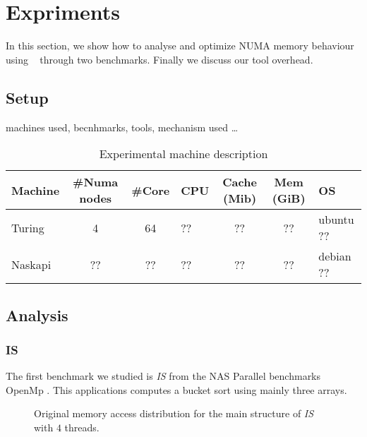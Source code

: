 
\section{Expriments}
\label{sec:expe}
In this section, we show how to analyse and optimize NUMA memory behaviour using
\TABARNAC~ through two benchmarks. Finally we discuss our tool overhead.
\subsection{Setup}
\label{sec:expe-setup}
machines used, becnhmarks, tools, mechanism used \ldots

\begin{table}
    \centering
    \resizebox{\linewidth}{!}
    {
        \begin{tabular}{l|c|c|l|c|c|l}
            Machine & \#Numa nodes & \#Core & CPU & Cache (Mib) & Mem (GiB) & OS\\
            \hline
            Turing & 4 & 64 & ?? & ?? & ?? &  ubuntu ??\\
            \hline
            Naskapi & ?? &?? &?? &?? & ?? &debian ??\\
        \end{tabular}
    }
    \caption{Experimental machine description}
    \label{tab:machines}
\end{table}

\subsection{Analysis}
\label{sec:expe-analysis}

\subsubsection{IS}
The first benchmark we studied is \emph{IS} from the  NAS Parallel benchmarks OpenMp
\cite{Feng04Unstructured}. This applications computes a bucket sort using
mainly three arrays.

\begin{figure}[htb]
    \centering

    \caption{Original memory access distribution for the main structure of
        \emph{IS} with $4$ threads.}
    \label{fig:is-behaviour-orig}
\end{figure}

